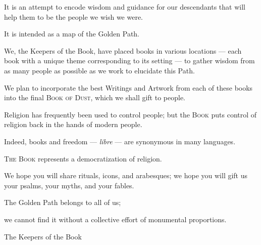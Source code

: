 \begin{multicols}{2}
\bverse It is an attempt to encode wisdom and guidance for our descendants that will help them to be the people we wish we were.

\bverse It is intended as a map of the Golden Path.

\bverse We, the Keepers of the Book, have placed books in various locations --- each book with a unique theme corresponding to its setting --- to gather wisdom from as many people as possible as we work to elucidate this Path.

\bverse We plan to incorporate the best Writings and Artwork from each of these books into the final \textsc{Book of Dust}, which we shall gift to people.

\bverse Religion has frequently been used to control people; but the \textsc{Book} puts control of religion back in the hands of modern people.

\bverse Indeed, books and freedom --- \textit{libre} --- are synonymous in many languages.

\bverse\textsc{The Book} represents a democratization of religion.

\bverse We hope you will share rituals, icons, and arabesques; we hope you will gift us your psalms, your myths, and your fables.

\bverse The Golden Path belongs to all of us;

\bverse we cannot find it without a collective effort of monumental proportions.
\bigskip
\begin{flushright}
The Keepers of the Book
\end{flushright}
\end{multicols}